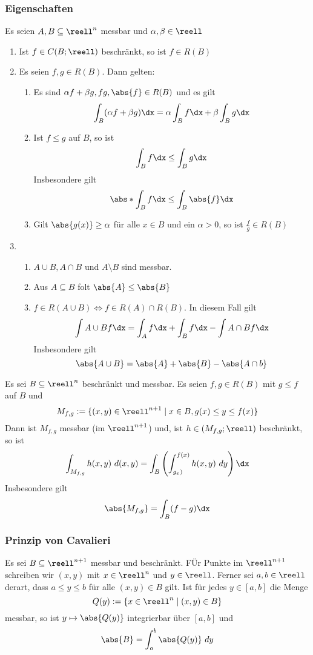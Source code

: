 \documentclass{kit}
\begin{document}
    \subsubsection{Eigenschaften}
      Es seien $A,B\subseteq\reell^n$ messbar und $\alpha,\beta\in\reell$
      \begin{enumerate}
        \item Ist $f\in C(B;\reell)$ beschränkt, so ist $f\in R(B)$
        \item Es seien $f,g\in R(B)$. Dann gelten:
          \begin{enumerate}[label=\roman*)]
            \item Es sind $\alpha f+\beta g,fg,\abs{f}\in R(B)$ und es gilt
              $$\int_B(\alpha f+\beta g)\dx=\alpha\int_Bf\dx+\beta\int_Bg\dx$$
            \item Ist $f\le g$ auf $B$, so ist
              $$\int_Bf\dx\le\int_Bg\dx$$
              Insbesondere gilt
              $$\abs*{\int_Bf\dx}\le\int_B\abs{f}\dx$$
            \item Gilt $\abs{g(x)}\ge\alpha$ für alle $x\in B$ und ein $\alpha>0$, so ist $\frac{f}{g}\in R(B)$
          \end{enumerate}
        \item \begin{enumerate}[label=\roman*)]
            \item $A\cup B,A\cap B$ und $A\setminus B$ sind messbar.
            \item Aus $A\subseteq B$ folt $\abs{A}\le\abs{B}$
            \item $f\in R(A\cup B)\Longleftrightarrow f\in R(A)\cap R(B)$. In diesem Fall gilt
              $$\int{A\cup B}f\dx=\int_Af\dx+\int_Bf\dx-\int{A\cap B}f\dx$$
              Insbesondere gilt
              $$\abs{A\cup B}=\abs{A}+\abs{B}-\abs{A\cap b}$$
          \end{enumerate}
      \end{enumerate}
      Es sei $B\subseteq\reell^n$ beschränkt und messbar. Es seien $f,g\in R(B)$ mit $g\le f$ auf $B$ und
      $$M_{f,g}:=\{(x,y)\in\reell^{n+1}\mid x\in B,g(x)\le y\le f(x)\}$$
      Dann ist $M_{f,g}$ messbar (im $\reell^{n+1}$) und, ist $h\in(M_{f,g};\reell)$ beschränkt, so ist
      $$\int_{M_{f,g}}h(x,y)\ d(x,y)=\int_B\left(\int^{f(x)}_{g_x)}h(x,y)\ dy\right)\dx$$
      Insbesondere gilt
      $$\abs{M_{f,g}}=\int_B(f-g)\dx$$
    \subsubsection{Prinzip von Cavalieri}
      Es sei $B\subseteq\reell^{n+1}$ messbar und beschränkt. FÜr Punkte im $\reell^{n+1}$ schreiben wir $(x,y)$ mit 
      $x\in\reell^n$ und $y\in\reell$. Ferner sei $a,b\in\reell$ derart, dass $a\le y\le b$ für alle $(x,y)\in B$ gilt. Ist
      für jedes $y\in[a,b]$ die Menge
      $$Q(y):=\{x\in\reell^n\mid(x,y)\in B\}$$
      messbar, so ist $y\mapsto\abs{Q(y)}$ integrierbar über $[a,b]$ und
      $$\abs{B}=\int^b_a\abs{Q(y)}\ dy$$
\end{document}
